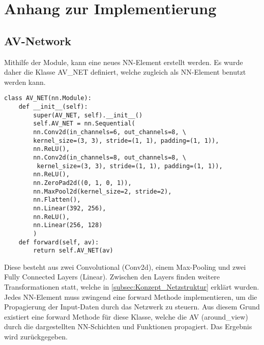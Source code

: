 \chapter{Anhang zur Implementierung}

\section{AV-Network} \label{sec:Anhang_AV_Network}
Mithilfe der Module, kann eine neues NN-Element erstellt werden.
Es wurde daher die Klasse AV\_NET definiert, welche zugleich als NN-Element benutzt werden kann.
\begin{lstlisting}[caption=Implementierung des AV-NET, style=Python]
class AV_NET(nn.Module):
	def __init__(self):
		super(AV_NET, self).__init__()
		self.AV_NET = nn.Sequential(
		nn.Conv2d(in_channels=6, out_channels=8, \
		kernel_size=(3, 3), stride=(1, 1), padding=(1, 1)),
		nn.ReLU(),
		nn.Conv2d(in_channels=8, out_channels=8, \
		 kernel_size=(3, 3), stride=(1, 1), padding=(1, 1)),
		nn.ReLU(),
		nn.ZeroPad2d((0, 1, 0, 1)),
		nn.MaxPool2d(kernel_size=2, stride=2),
		nn.Flatten(),
		nn.Linear(392, 256),
		nn.ReLU(),
		nn.Linear(256, 128)
		)
	def forward(self, av):
		return self.AV_NET(av)
\end{lstlisting}
Diese besteht aus zwei Convolutional (Conv2d), einem Max-Pooling und zwei Fully Connected Layers (Linear). 
Zwischen den Layers finden weitere Transformationen statt, welche in \autoref{subsec:Konzept_Netzstruktur} erklärt wurden.
Jedes NN-Element muss zwingend eine forward Methode implementieren, um die Propagierung der Input-Daten durch das Netzwerk zu steuern. Aus diesem Grund existiert eine forward Methode für diese Klasse, welche die AV (around\_view) durch die dargestellten NN-Schichten und Funktionen propagiert. Das Ergebnis wird zurückgegeben.


